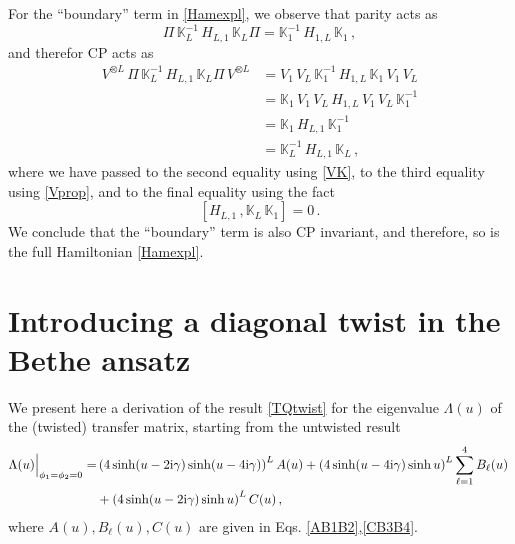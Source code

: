 \documentclass[12pt]{article}
\numberwithin{equation}{section}
\newcommand{\ri}{{\rm i}}
\begin{document}
For the ``boundary'' term in \eqref{Hamexpl}, we observe that parity acts as
\begin{equation}
    \Pi\, \mathbb{K}^{-1}_L\, H_{L,1}\, \mathbb{K}_L  \Pi = \mathbb{K}^{-1}_1\, H_{1,L}\, \mathbb{K}_1 \,,
\end{equation}
and therefor CP acts as
\begin{align}
    V^{\otimes L}\, \Pi\, \mathbb{K}^{-1}_L\, H_{L,1}\, \mathbb{K}_L  \Pi\, V^{\otimes L}  &= V_1\, V_L\, \mathbb{K}^{-1}_1\, H_{1,L}\, \mathbb{K}_1\, V_1\, V_L \nonumber \\
    &= \mathbb{K}_1\, V_1\, V_L\,  H_{1,L}\,  V_1\, V_L\, \mathbb{K}^{-1}_1 \nonumber \\
    &= \mathbb{K}_1\,  H_{L,1}\, \mathbb{K}^{-1}_1 \nonumber \\
    &= \mathbb{K}^{-1}_L\,  H_{L,1}\, \mathbb{K}_L \,,
\end{align}
where we have passed to the second equality using \eqref{VK}, to the third equality using \eqref{Vprop}, and to the final equality using the fact
\begin{equation}
    \left[ H_{L,1}\,, \mathbb{K}_L\, \mathbb{K}_1 \right] = 0 \,.
\end{equation}
We conclude that the ``boundary'' term is also CP invariant, and therefore, so is the full Hamiltonian \eqref{Hamexpl}.

\section{Introducing a diagonal twist in the Bethe ansatz}\label{sec:twistBA}

We present here a derivation of the
result \eqref{TQtwist} for the eigenvalue $\Lambda(u)$ of the (twisted) transfer matrix, starting from the untwisted result \cite{Resh87}
\begin{equation}
    \begin{aligned}
    \Lambda(u)\Big\vert_{\phi_1=\phi_2=0} =& \left(4\sinh(u-2\ri\gamma)\sinh(u-4\ri\gamma)\right)^{L} A(u)
               + \left(4 \sinh(u-4\ri\gamma) \sinh u\right)^L \sum_{\ell=1}^4 B_\ell(u)\,\\
               &+ \left(4\sinh(u-2\ri\gamma)\sinh u\right)^{L} C(u) \,,
    \end{aligned}
    \label{TQ}
\end{equation}
where $A(u), B_{\ell}(u), C(u)$ are given in Eqs. \eqref{AB1B2},\eqref{CB3B4}.
\end{document}
